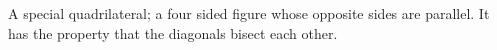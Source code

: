 A special quadrilateral; a four sided figure whose opposite 
sides are parallel. It has the property that the diagonals bisect each other.
